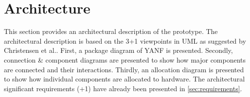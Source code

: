 \documentclass[main.tex]{subfiles}
\begin{document}
%


\section{Architecture}
\label{sec:Architecture}
This section provides an architectural description of the prototype. The architectural description is based on the 3+1 viewpoints in UML as suggested by Christensen et al.\cite{Christensen2007An0}. First, a package diagram of YANF is presented. Secondly, connection \& component diagrams are presented to show how major components are connected and their interactions. Thirdly, an allocation diagram is presented to show how individual components are allocated to hardware. The architectural significant requirements (+1) have already been presented in \autoref{sec:requirements}.

\end{document}
